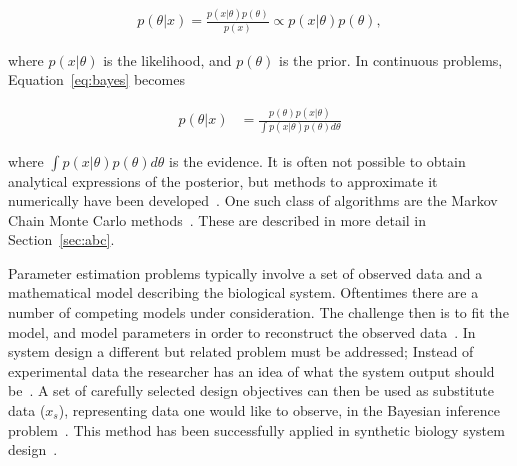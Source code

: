 \begin{align}
	p(θ|x) = \frac{p(x|θ)p(θ)}{p(x)} \propto p(x|θ)p(θ), \label{eq:bayes}
\end{align}



\noindent where $p(x|θ)$ is the likelihood, and $p(θ)$ is the prior. In continuous problems, Equation~\ref{eq:bayes} becomes

\begin{align}%
	p(θ|x) &= \frac{p(θ)p(x|θ)}{\int p(x|θ)p(θ)dθ}
\end{align}


\noindent where $\displaystyle \int p(x|θ)p(θ)dθ$ is the evidence. It is often not possible to obtain analytical expressions of the posterior, but methods to approximate it numerically have been developed~\autocite{Barnes:2011bk}. One such class of algorithms are the Markov Chain Monte Carlo methods~\autocite{Gilks96}. These are described in more detail in Section~\ref{sec:abc}.


Parameter estimation problems typically involve a set of observed data and a mathematical model describing the biological system. Oftentimes there are a number of competing models under consideration. The challenge then is to fit the model, and model parameters in order to reconstruct the observed data~\autocite{Ma:2009ig}. In system design a different but related problem must be addressed; Instead of experimental data the researcher has an idea of what the system output should be~\autocite{Barnes:2011bk}. A set of carefully selected design objectives can then be used as substitute data ($x_s$), representing data one would like to observe, in the Bayesian inference problem~\autocite{Barnes:2011bk}. This method has been successfully applied in synthetic biology system design~\autocite{Barnes:2011hh, Woods:2016eh}. 




